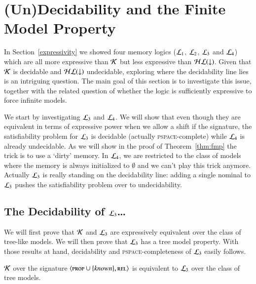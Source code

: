 \section{(Un)Decidability and the Finite Model Property}

In Section~\ref{expressivity} we showed four memory logics
($\mathcal{L}_1$, $\mathcal{L}_2$, $\mathcal{L}_3$ and $\mathcal{L}_4$) which are all more
expressive than $\mathcal{K}$ but less expressive than $\mathcal{HL}({\downarrow})$. Given
that $\mathcal{K}$ is decidable and $\mathcal{HL}({\downarrow})$ undecidable, exploring
where the decidability line lies is an intriguing question.  The
main goal of this section is to investigate this issue, together
with the related question of whether the logic is sufficiently
expressive to force infinite models.

We start by investigating $\mathcal{L}_3$ and $\mathcal{L}_4$. We will show
that even though they are equivalent in terms of expressive power
when we allow a shift if the signature, the satisfiability problem
for $\mathcal{L}_3$ is decidable (actually \textsc{pspace}-complete) while
$\mathcal{L}_4$ is already undecidable. As we will show in the proof of
Theorem~\ref{thm:fmp} the trick is to use a `dirty' memory. In
$\mathcal{L}_4$, we are restricted to the class of models where the
memory is always initialized to $\emptyset$ and we can't play this
trick anymore.  Actually $\mathcal{L}_3$ is really standing on the
decidability line: adding a single nominal to $\mathcal{L}_3$ pushes the
satisfiability problem over to undecidability.

\subsection{The Decidability of $\mathcal{L}_3$\ldots}

We will first prove that $\mathcal{K}$ and $\mathcal{L}_3$ are expressively
equivalent over the class of tree-like models.
We will then prove that $\mathcal{L}_3$ has a tree model property.
With those results at hand, decidability and \textsc{pspace}-completeness
of $\mathcal{L}_3$ easily follows.

\begin{thm}\label{prop:sat-preserv-tree}
$\mathcal{K}$  over the signature $\langle \textsc{prop} \cup \{\mathit{known}\},\textsc{rel} \rangle$
is equivalent to $\mathcal{L}_3$ over the class of tree models.
\end{thm}

